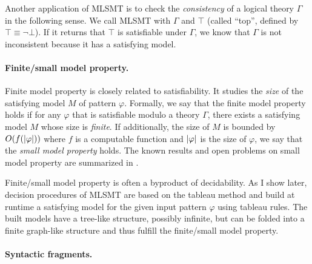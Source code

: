 \documentclass[11pt]{article}
\begin{document}
Another application of MLSMT is to check the \emph{consistency} of a logical 
theory $\Gamma$ in the following sense. 
We call MLSMT with $\Gamma$ and $\top$ 
(called ``top'', defined by $\top \equiv \neg \bot$).
If it returns that $\top$ is satisfiable under $\Gamma$,
we know that $\Gamma$ is not inconsistent because it has a satisfying model. 

\paragraph{Finite/small model property.}

Finite model property is closely related to satisfiability.
It studies the \emph{size} of the satisfying model $M$ of pattern $\varphi$.
Formally, we say that the finite model property holds
if for any $\varphi$ that is satisfiable modulo a theory $\Gamma$,
there exists a satisfying model $M$ whose size is \emph{finite}.
If additionally, the size of $M$ is bounded by $O(f(|\varphi|))$
where $f$ is a computable function and $|\varphi|$ is the size of $\varphi$, we say that the \emph{small model property} holds.
The known results and open problems on small model property 
are summarized in .

Finite/small model property is often a byproduct of decidability.
As I show later, decision procedures of MLSMT are based on the tableau method
and build at runtime a satisfying model for the given input pattern $\varphi$ using tableau rules.
The built models have a tree-like structure, possibly infinite, but can be folded into a finite graph-like structure and thus fulfill the finite/small model property.

\paragraph{Syntactic fragments.}
\end{document}
